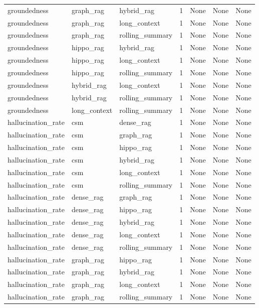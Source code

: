 \begin{tabular}{lllllll}
groundedness & graph\_rag & hybrid\_rag & 1 & None & None & None \\
groundedness & graph\_rag & long\_context & 1 & None & None & None \\
groundedness & graph\_rag & rolling\_summary & 1 & None & None & None \\
groundedness & hippo\_rag & hybrid\_rag & 1 & None & None & None \\
groundedness & hippo\_rag & long\_context & 1 & None & None & None \\
groundedness & hippo\_rag & rolling\_summary & 1 & None & None & None \\
groundedness & hybrid\_rag & long\_context & 1 & None & None & None \\
groundedness & hybrid\_rag & rolling\_summary & 1 & None & None & None \\
groundedness & long\_context & rolling\_summary & 1 & None & None & None \\
hallucination\_rate & csm & dense\_rag & 1 & None & None & None \\
hallucination\_rate & csm & graph\_rag & 1 & None & None & None \\
hallucination\_rate & csm & hippo\_rag & 1 & None & None & None \\
hallucination\_rate & csm & hybrid\_rag & 1 & None & None & None \\
hallucination\_rate & csm & long\_context & 1 & None & None & None \\
hallucination\_rate & csm & rolling\_summary & 1 & None & None & None \\
hallucination\_rate & dense\_rag & graph\_rag & 1 & None & None & None \\
hallucination\_rate & dense\_rag & hippo\_rag & 1 & None & None & None \\
hallucination\_rate & dense\_rag & hybrid\_rag & 1 & None & None & None \\
hallucination\_rate & dense\_rag & long\_context & 1 & None & None & None \\
hallucination\_rate & dense\_rag & rolling\_summary & 1 & None & None & None \\
hallucination\_rate & graph\_rag & hippo\_rag & 1 & None & None & None \\
hallucination\_rate & graph\_rag & hybrid\_rag & 1 & None & None & None \\
hallucination\_rate & graph\_rag & long\_context & 1 & None & None & None \\
hallucination\_rate & graph\_rag & rolling\_summary & 1 & None & None & None \\

\end{tabular}
